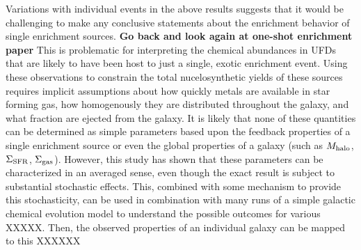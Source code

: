 Variations with individual events in the above results suggests that it would be challenging to make any conclusive statements about the enrichment behavior of single enrichment sources. \textbf{Go back and look again at one-shot enrichment paper} This is problematic for interpreting the chemical abundances in UFDs that are likely to have been host to just a single, exotic enrichment event. Using these observations to constrain the total nucelosynthetic yields of these sources requires implicit assumptions about how quickly metals are available in star forming gas, how homogenously they are distributed throughout the galaxy, and what fraction are ejected from the galaxy. It is likely that none of these quantities can be determined as simple parameters based upon the feedback properties of a single enrichment source or even the global properties of a galaxy (such as $M_{\rm halo}$, $\Sigma_{\rm SFR}$, $\Sigma_{\rm gas}$). However, this study has shown that these parameters can be characterized in an averaged sense, even though the exact result is subject to substantial stochastic effects. This, combined with some mechanism to provide this stochasticity, can be used in combination with many runs of a simple galactic chemical evolution model to understand the possible outcomes for various XXXXX. Then, the observed properties of an individual galaxy can be mapped to this XXXXXX




\setcounter{section}{0}%
\renewcommand\thesection{\thechapter.\Alph{section}}

%
%

\renewcommand\thesection{\thechapter.\arabic{section}}
